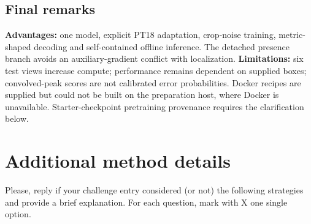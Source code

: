 \documentclass[a4paper,10pt,conference]{ieeeconf}
\begin{document}
\subsection{Final remarks}
\textbf{Advantages:} one model, explicit PT18 adaptation, crop-noise training, metric-shaped decoding and self-contained offline inference. The detached presence branch avoids an auxiliary-gradient conflict with localization. \textbf{Limitations:} six test views increase compute; performance remains dependent on supplied boxes; convolved-peak scores are not calibrated error probabilities. Docker recipes are supplied but could not be built on the preparation host, where Docker is unavailable. Starter-checkpoint pretraining provenance requires the clarification below.

\section{Additional method details}
Please, reply if your challenge entry considered (or not) the following strategies and provide a brief explanation. For each question, mark with X one single option.
\end{document}
